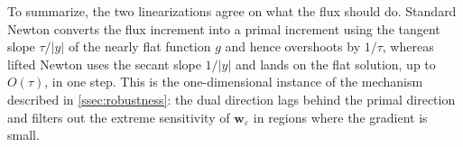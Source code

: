 \documentclass[11pt,pdflatex,sn-mathphys-num]{sn-jnl}
\theoremstyle{thmstyleone}%
\theoremstyle{thmstyletwo}%
\theoremstyle{thmstylethree}%
\newcommand{\bs}[1]{\ensuremath{\boldsymbol{#1}}}
\begin{document}
To summarize, the two linearizations agree on what the flux should do. Standard Newton converts the flux increment into a primal increment using the tangent slope $\tau/|y|$ of the nearly flat function $g$ and hence overshoots by $1/\tau$, whereas lifted Newton uses the secant slope $1/|y|$ and lands on the flat solution, up to $O(\tau)$, in one step. This is the one-dimensional instance of the mechanism described in \cref{ssec:robustness}: the dual direction lags behind the primal direction and filters out the extreme sensitivity of $\bs w_\varepsilon$ in regions where the gradient is small.
\end{document}
